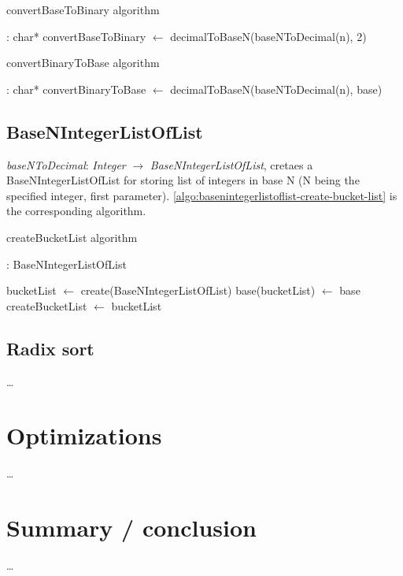 \documentclass[book, nodocumentinfo]{upmethodology-document}
\begin{document}
\begin{algorithm}[H]
    \label{algo:basenintegerlist-convert-base-to-binary}
    \caption{convertBaseToBinary algorithm}

    \begin{algorithmic}
         : char*
            \State convertBaseToBinary \(\leftarrow\) decimalToBaseN(baseNToDecimal(n), 2)
        \EndFunction
    \end{algorithmic}
\end{algorithm}

\begin{algorithm}[H]
    \label{algo:basenintegerlist-convert-binary-to-base}
    \caption{convertBinaryToBase algorithm}

    \begin{algorithmic}
         : char*
            \State convertBinaryToBase \(\leftarrow\) decimalToBaseN(baseNToDecimal(n), base)
        \EndFunction
    \end{algorithmic}
\end{algorithm}

\section{BaseNIntegerListOfList}

\emph{baseNToDecimal}: \emph{Integer} \(\rightarrow\) \emph{BaseNIntegerListOfList},
cretaes a BaseNIntegerListOfList for storing list of integers in base N (N being the specified integer, first parameter).
\ref{algo:basenintegerlistoflist-create-bucket-list} is the corresponding algorithm.

\begin{algorithm}[H]
	\label{algo:basenintegerlistoflist-create-bucket-list}
	\caption{createBucketList algorithm}

	\begin{algorithmic}
		 : BaseNIntegerListOfList

		\State bucketList \(\leftarrow \) create(BaseNIntegerListOfList)
		\State base(bucketList) \(\leftarrow \) base
		\State createBucketList \(\leftarrow \) bucketList

		\EndFunction
	\end{algorithmic}
\end{algorithm}

\section{Radix sort}

…

\chapter{Optimizations}

…

\chapter{Summary / conclusion}

…



{}
\end{document}

